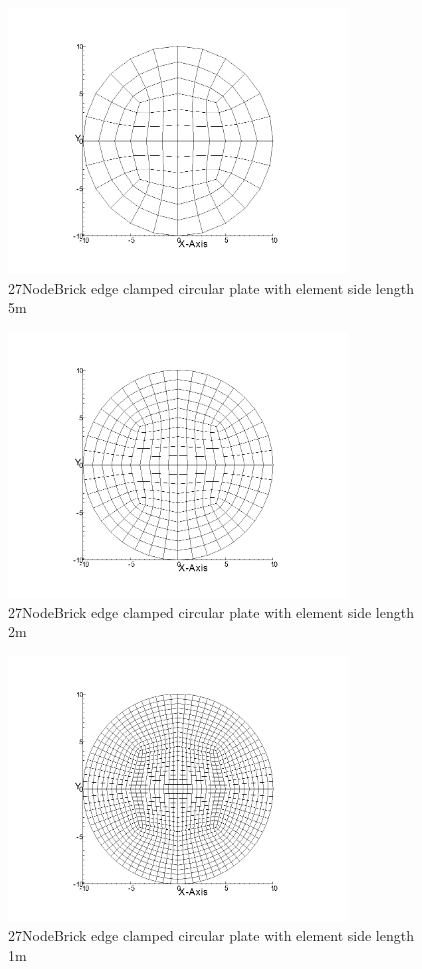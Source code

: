 \documentclass[fleqn,11pt,letter]{article}
\begin{document}
\newpage

\begin{figure}[H]
  \centering
  \includegraphics[width=9cm]{../Figure_files/27NodeBrick/circular_plate2.png}
  \caption{27NodeBrick edge clamped circular plate with element side length 5m }
  \label{fig 27NodeBrick edges clamped circular plate with element side length 5m }
\end{figure}


\begin{figure}[H]
  \centering
  \includegraphics[width=9cm]{../Figure_files/27NodeBrick/circular_plate3.png}
  \caption{27NodeBrick edge clamped circular plate with element side length 2m }
  \label{fig 27NodeBrick edges clamped circular plate with element side length 2m }
\end{figure}

\newpage

\begin{figure}[H]
  \centering
  \includegraphics[width=9cm]{../Figure_files/27NodeBrick/circular_plate4.png}
  \caption{27NodeBrick edge clamped circular plate with element side length 1m }
  \label{fig 27NodeBrick edges clamped circular plate with element side length 1m }
\end{figure}
\end{document}
